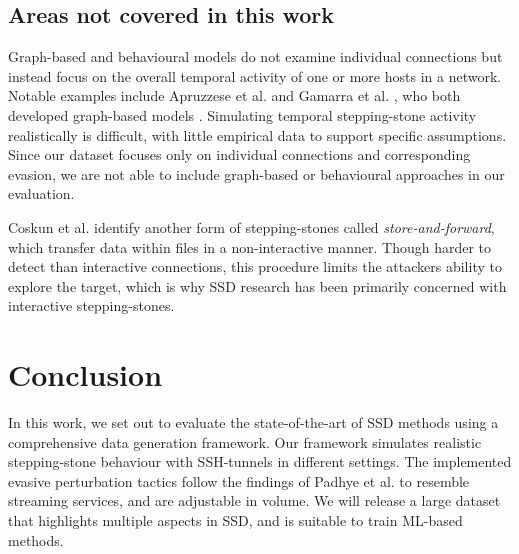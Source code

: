 \documentclass[runningheads,11pt]{llncs}\usepackage[]{graphicx}\usepackage[]{color}
\begin{document}




\subsection{Areas not covered in this work}

Graph-based and behavioural models do not examine individual connections but instead focus on the overall temporal activity of one or more hosts in a network. 
Notable examples include Apruzzese et al. \cite{apruzzese2017detection} and Gamarra et al. \cite{gamarra2018analysis}, who both developed graph-based models .
Simulating temporal stepping-stone activity realistically is difficult, with little empirical data to support specific assumptions. Since our dataset focuses only on individual connections and corresponding evasion, we are not able to include graph-based or behavioural approaches in our evaluation.

Coskun et al. \cite{coskun2007efficient} identify another form of stepping-stones called \textit{store-and-forward}, which transfer data within files in a non-interactive manner. Though harder to detect than interactive connections, this procedure limits the attackers ability to explore the target, which is why SSD research has been primarily concerned with interactive stepping-stones.


\section{Conclusion}

In this work, we set out to evaluate the state-of-the-art of SSD methods using a comprehensive data generation framework. Our framework simulates realistic stepping-stone behaviour with SSH-tunnels in different  settings. The implemented evasive perturbation tactics follow the findings of Padhye et al. \cite{padhye2010evading} to resemble streaming services, and are adjustable in volume. We will release a large dataset that highlights multiple aspects in SSD, and is suitable to train ML-based methods. 
\end{document}
